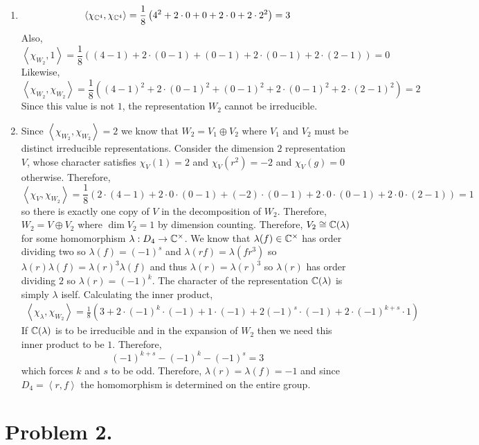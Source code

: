 \documentclass[12pt]{extarticle}
\begin{document}
\begin{enumerate}
\item 
\[ \left< \chi_{\mathbb{C}^4}, \chi_{\mathbb{C}^4} \right> = \frac{1}{8} \left( 4^2 + 2 \cdot 0 + 0 + 2 \cdot 0 + 2 \cdot 2^2 \right) = 3\]
Also,
\[ \left< \chi_{W_2}, 1 \right> = \frac{1}{8} \left( (4-1) + 2 \cdot (0 - 1) + (0 - 1) + 2 \cdot(0 - 1) + 2 \cdot(2 - 1)  \right) = 0 \]
Likewise,
\[ \left< \chi_{W_2}, \chi_{W_2} \right> = \frac{1}{8} \left( (4-1)^2 + 2 \cdot (0 - 1)^2 + (0 - 1)^2 + 2 \cdot(0 - 1)^2 + 2 \cdot (2 - 1)^2  \right) = 2 \]
Since this value is not $1$, the representation $W_2$ cannot be irreducible. 
\item Since $\left< \chi_{W_2}, \chi_{W_2} \right> = 2$ we know that $W_2 = V_1 \oplus V_2$ where $V_1$ and $V_2$ must be distinct irreducible representations. Consider the dimension $2$ representation $V$, whose character satisfies $\chi_V(1) = 2$ and $\chi_V(r^2) = -2$ and $\chi_V(g) = 0$ otherwise. Therefore,
\[ \left< \chi_V, \chi_{W_2} \right> = \frac{1}{8} \left( 2 \cdot (4 - 1) + 2 \cdot 0 \cdot (0 - 1) + (-2) \cdot (0 - 1) + 2 \cdot 0 \cdot (0 - 1) + 2 \cdot 0 \cdot (2 - 1) \right) = 1\]
so there is exactly one copy of $V$ in the decomposition of $W_2$. Therefore, $W_2 = V \oplus V_2$ where $\dim{V_2} = 1$ by dimension counting. Therefore, $V_2 \cong \mathbb{C}(\lambda)$ for some homomorphism $\lambda : D_4 \to \mathbb{C}^\times$. We know that $\lambda(f) \in \mathbb{C}^\times$ has order dividing two so $\lambda(f) = (-1)^s$ and $\lambda(rf) = \lambda(fr^3)$ so $\lambda(r) \lambda(f) = \lambda(r)^3 \lambda(f)$ and thus $\lambda(r) = \lambda(r)^3$ so $\lambda(r)$ has order dividing $2$ so $\lambda(r) = (-1)^k$. The character of the representation $\mathbb{C}(\lambda)$ is simply $\lambda$ iself. Calculating the inner product,
\begin{align*}
\left< \chi_\lambda, \chi_{W_2} \right> = \frac{1}{8} \left( 3 + 2 \cdot (-1)^k \cdot (-1) + 1 \cdot (-1) + 2 (-1)^s \cdot (-1) + 2 \cdot (-1)^{k + s} \cdot 1 \right)
\end{align*} 
If $\mathbb{C}(\lambda)$ is to be irreducible and in the expansion of $W_2$ then we need this inner product to be $1$. Therefore,
\[ (-1)^{k + s} - (-1)^k - (-1)^s = 3\]
which forces $k$ and $s$ to be odd. Therefore, $\lambda(r) = \lambda(f) = -1$ and since $D_4 = \left<r, f \right>$ the homomorphism is determined on the entire group. 
  
\end{enumerate}

\section*{Problem 2.}
\end{document}
